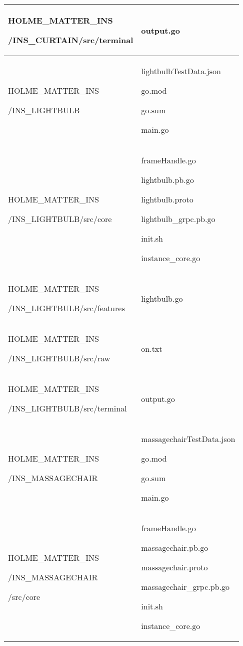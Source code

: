 \documentclass[conference]{IEEEtran}
\begin{document}
\begin{table}[h]
\begin{tabular}{|p{3.9cm}|p{3.9cm}|}
          HOLME\_MATTER\_INS\par/INS\_CURTAIN/src/terminal& output.go\\ \hline
          HOLME\_MATTER\_INS\par/INS\_LIGHTBULB & lightbulbTestData.json\par go.mod\par go.sum\par main.go\\ \hline
          HOLME\_MATTER\_INS\par/INS\_LIGHTBULB/src/core & frameHandle.go\par lightbulb.pb.go\par lightbulb.proto\par lightbulb\_grpc.pb.go\par init.sh\par instance\_core.go\\ \hline
          HOLME\_MATTER\_INS\par/INS\_LIGHTBULB/src/features& lightbulb.go\\ \hline
          HOLME\_MATTER\_INS\par/INS\_LIGHTBULB/src/raw& on.txt\\ \hline
          HOLME\_MATTER\_INS\par/INS\_LIGHTBULB/src/terminal& output.go\\ \hline
          HOLME\_MATTER\_INS\par/INS\_MASSAGECHAIR & massagechairTestData.json\par go.mod\par go.sum\par main.go\\ \hline
          HOLME\_MATTER\_INS\par/INS\_MASSAGECHAIR\par /src/core & frameHandle.go\par massagechair.pb.go\par massagechair.proto\par massagechair\_grpc.pb.go\par init.sh\par instance\_core.go\\ \hline
	\end{tabular}
\end{table}
\clearpage
\end{document}
